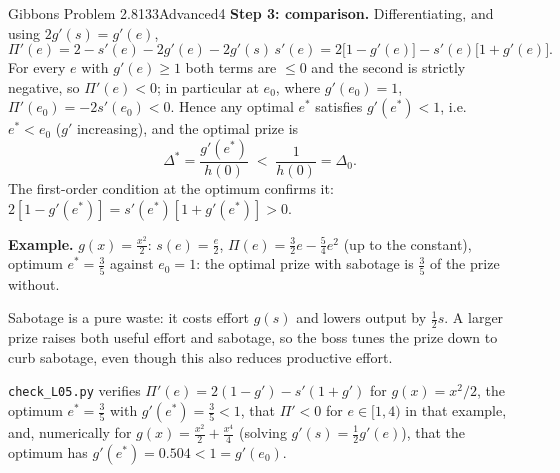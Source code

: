 \begin{exsol}{Gibbons Problem 2.8}{133}{Advanced}{4}
\textbf{Step 3: comparison.} Differentiating, and using $2g'(s) = g'(e)$,
\[
  \Pi'(e) = 2 - s'(e) - 2g'(e) - 2g'(s)\,s'(e) = 2\bigl[1 - g'(e)\bigr] - s'(e)\bigl[1 + g'(e)\bigr].
\]
For every $e$ with $g'(e) \ge 1$ both terms are $\le 0$ and the second is strictly negative, so
$\Pi'(e) < 0$; in particular at $e_0$, where $g'(e_0) = 1$, $\Pi'(e_0) = -2s'(e_0) < 0$. Hence any optimal $e^*$ satisfies
$g'(e^*) < 1$, i.e.\ $e^* < e_0$ ($g'$ increasing), and the optimal prize is
\[
  \Delta^* = \frac{g'(e^*)}{h(0)} \;<\; \frac{1}{h(0)} = \Delta_0 .
\]
The first-order condition at the optimum confirms it: $2[1 - g'(e^*)] = s'(e^*)[1 + g'(e^*)] > 0$.

\textbf{Example.} $g(x) = \frac{x^2}{2}$: $s(e) = \frac e2$, $\Pi(e) = \tfrac32 e - \tfrac54 e^2$ (up to the constant), optimum $e^* = \frac35$ against
$e_0 = 1$: the optimal prize with sabotage is $\frac35$ of the prize without.

\interp Sabotage is a pure waste: it costs effort $g(s)$ and lowers output by $\frac12 s$. A larger prize
raises both useful effort and sabotage, so the boss tunes the prize down to curb sabotage, even though this
also reduces productive effort.

\verify \texttt{check\_L05.py} verifies $\Pi'(e) = 2(1 - g') - s'(1 + g')$ for $g(x) = x^2/2$, the optimum $e^* = \frac35$ with $g'(e^*) = \frac35 < 1$,
that $\Pi' < 0$ for $e \in [1,4)$ in that example, and, numerically for $g(x) = \frac{x^2}{2} + \frac{x^4}{4}$ (solving $g'(s) = \frac12 g'(e)$), that the
optimum has $g'(e^*) = 0.504 < 1 = g'(e_0)$.

\end{exsol}
